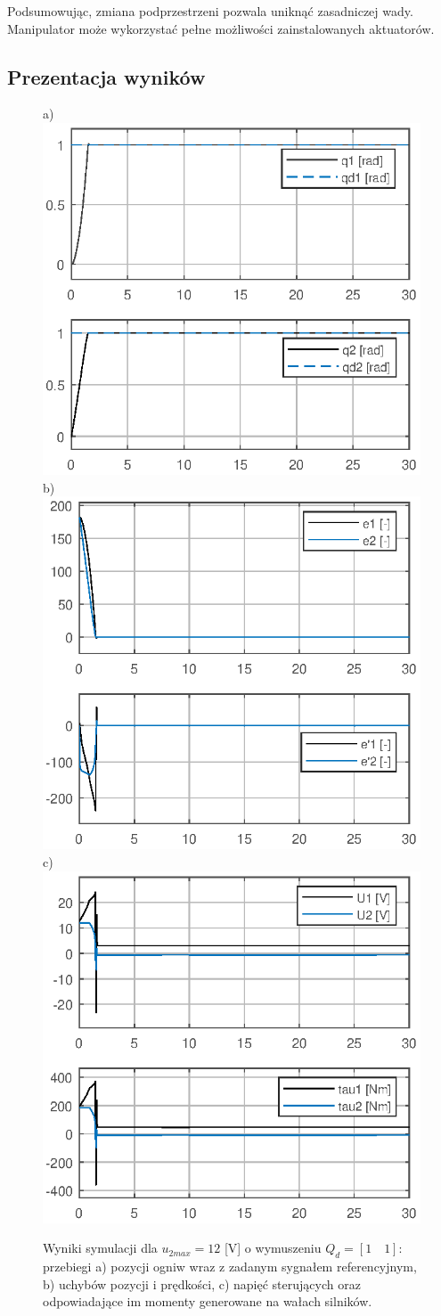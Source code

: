 \documentclass[12pt, a4paper, polish]{article}
\begin{document}
	Podsumowując, zmiana podprzestrzeni pozwala uniknąć zasadniczej wady. Manipulator może wykorzystać pełne możliwości zainstalowanych aktuatorów.
	
	\subsection{Prezentacja wyników}
	\begin{figure}[h]\centering
		a) \includegraphics[width=0.30\columnwidth]{SRManL4_ZADANIE2/figs/01Pozycje_U12} b)\includegraphics[width=0.30\columnwidth]{SRManL4_ZADANIE2/figs/01Uchyby_U12} c)\includegraphics[width=0.30\columnwidth]{SRManL4_ZADANIE2/figs/01Sygnaly_U12}\caption{
			Wyniki symulacji dla $u_{2max}=12$ [V] o wymuszeniu $Q_d=[1\quad1]$: przebiegi a) pozycji ogniw wraz z zadanym sygnałem referencyjnym, b) uchybów pozycji i prędkości, c)  napięć sterujących oraz odpowiadające im momenty generowane na wałach silników.}\label{fig:hiperprostopadloscian12v}
	\end{figure}
\end{document}
